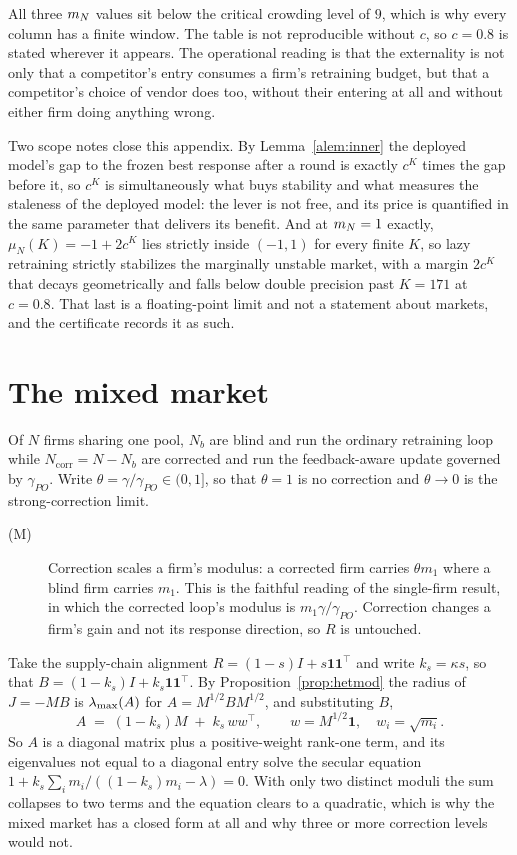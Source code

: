 All three $m_N$ values sit below the critical crowding level of $9$, which is why every column has a finite window. The table is not reproducible without $c$, so $c = 0.8$ is stated wherever it appears. The operational reading is that the externality is not only that a competitor's entry consumes a firm's retraining budget, but that a competitor's choice of vendor does too, without their entering at all and without either firm doing anything wrong.

Two scope notes close this appendix. By Lemma~\ref{alem:inner} the deployed model's gap to the frozen best response after a round is exactly $c^K$ times the gap before it, so $c^K$ is simultaneously what buys stability and what measures the staleness of the deployed model: the lever is not free, and its price is quantified in the same parameter that delivers its benefit. And at $m_N = 1$ exactly, $\mu_N(K) = -1 + 2c^K$ lies strictly inside $(-1,1)$ for every finite $K$, so lazy retraining strictly stabilizes the marginally unstable market, with a margin $2c^K$ that decays geometrically and falls below double precision past $K=171$ at $c=0.8$. That last is a floating-point limit and not a statement about markets, and the certificate records it as such.
\section{The mixed market}
\label{app:mixed}

Of $N$ firms sharing one pool, $N_b$ are blind and run the ordinary retraining loop while $N_{\text{corr}} = N - N_b$ are corrected and run the feedback-aware update governed by $\gamma_{PO}$. Write $\theta = \gamma/\gamma_{PO} \in (0,1]$, so that $\theta=1$ is no correction and $\theta \to 0$ is the strong-correction limit.

\begin{description}
\item[(M)] Correction scales a firm's modulus: a corrected firm carries $\theta m_1$ where a blind firm carries $m_1$. This is the faithful reading of the single-firm result, in which the corrected loop's modulus is $m_1\gamma/\gamma_{PO}$. Correction changes a firm's gain and not its response direction, so $R$ is untouched.
\end{description}

Take the supply-chain alignment $R = (1-s)I + s\mathbf{1}\mathbf{1}^{\top}$ and write $k_s = \kappa s$, so that $B = (1-k_s)I + k_s\mathbf{1}\mathbf{1}^{\top}$. By Proposition~\ref{prop:hetmod} the radius of $J = -MB$ is $\lambda_{\max}(A)$ for $A = M^{1/2}BM^{1/2}$, and substituting $B$,
\[
  A \;=\; (1-k_s)M \;+\; k_s\, ww^{\top}, \qquad w = M^{1/2}\mathbf{1}, \quad w_i = \sqrt{m_i}.
\]
So $A$ is a diagonal matrix plus a positive-weight rank-one term, and its eigenvalues not equal to a diagonal entry solve the secular equation $1 + k_s\sum_i m_i/((1-k_s)m_i - \lambda) = 0$. With only two distinct moduli the sum collapses to two terms and the equation clears to a quadratic, which is why the mixed market has a closed form at all and why three or more correction levels would not.

